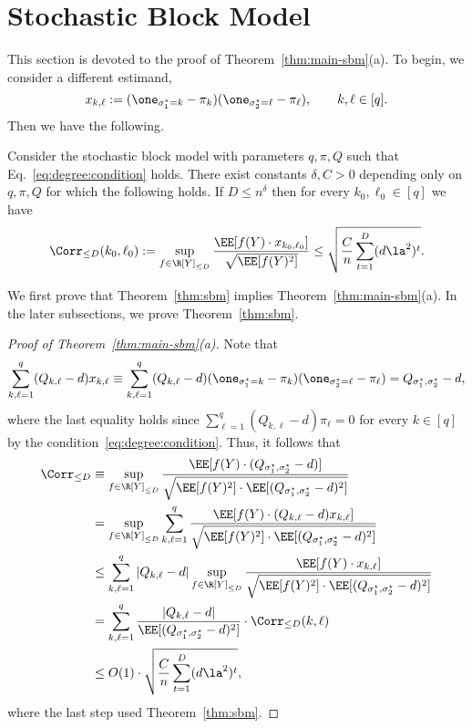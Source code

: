 \documentclass[11pt]{article}
\begin{document}
\section{Stochastic Block Model}
\label{sec:sbm}

This section is devoted to the proof of Theorem~\ref{thm:main-sbm}(a). To begin, we consider a different estimand,
\[
x_{k,\ell}:=(\one_{\sigma^\star_1=k}-\pi_k)(\one_{\sigma^\star_2=\ell}-\pi_\ell), \qquad k,\ell\in [q].
\]
Then we have the following.
\begin{theorem}\label{thm:sbm}
Consider the stochastic block model with parameters $q,\pi,Q$ such that Eq.~\eqref{eq:degree:condition} holds. There exist constants $\delta,C>0$ depending only on $q,\pi,Q$ for which the following holds. If $D\leq n^\delta$ then for every $k_0,\ell_0 \in [q]$ we have
\[
\Corr_{\leq D}(k_0,\ell_0) := \sup_{f\in \R[Y]_{\leq D}} \frac{\EE[f(Y) \cdot x_{k_0,\ell_0}]}{\sqrt{\EE[f(Y)^2]}}\leq \sqrt{\frac{C}{n}\sum_{t=1}^{D}(d\la^2)^{t}}.
\]
\end{theorem}

\noindent We first prove that Theorem~\ref{thm:sbm} implies Theorem~\ref{thm:main-sbm}(a). In the later subsections, we prove Theorem~\ref{thm:sbm}.

\begin{proof}[Proof of Theorem~\ref{thm:main-sbm}(a)]
Note that 
\[
\sum_{k,\ell=1}^{q}(Q_{k,\ell}-d)x_{k,\ell}\equiv \sum_{k,\ell=1}^{q}(Q_{k,\ell}-d) (\one_{\sigma^\star_1=k}-\pi_k) (\one_{\sigma^\star_2=\ell}-\pi_\ell)=Q_{\sigma^\star_1,\sigma^\star_2}-d,
\]
where the last equality holds since $\sum_{\ell=1}^{q}(Q_{k,\ell}-d)\pi_{\ell}=0$ for every $k\in [q]$ by the condition~\eqref{eq:degree:condition}. Thus, it follows that
\begin{align*}
\Corr_{\le D} &\equiv \sup_{f\in \R[Y]_{\leq D}} \frac{\EE[f(Y) \cdot (Q_{\sigma^\star_1,\sigma^\star_2}-d)]}{\sqrt{\EE[f(Y)^2] \cdot \EE[(Q_{\sigma^\star_1,\sigma^\star_2}-d)^2]}}\\
&= \sup_{f\in \R[Y]_{\leq D}} \sum_{k,\ell=1}^q \frac{\EE[f(Y) \cdot (Q_{k,\ell}-d)x_{k,\ell}]}{\sqrt{\EE[f(Y)^2] \cdot \EE[(Q_{\sigma^\star_1,\sigma^\star_2}-d)^2]}} \\
&\le \sum_{k,\ell=1}^q |Q_{k,\ell}-d| \sup_{f\in \R[Y]_{\leq D}} \frac{\EE[f(Y) \cdot x_{k,\ell}]}{\sqrt{\EE[f(Y)^2] \cdot \EE[(Q_{\sigma^\star_1,\sigma^\star_2}-d)^2]}} \\
&= \sum_{k,\ell=1}^q \frac{|Q_{k,\ell}-d|}{\EE[(Q_{\sigma^\star_1,\sigma^\star_2}-d)^2]} \cdot \Corr_{\le D}(k,\ell) \\
&\le O(1) \cdot \sqrt{\frac{C}{n}\sum_{t=1}^{D}(d\la^2)^t},
\end{align*}
where the last step used Theorem~\ref{thm:sbm}.
\end{proof}
\end{document}
